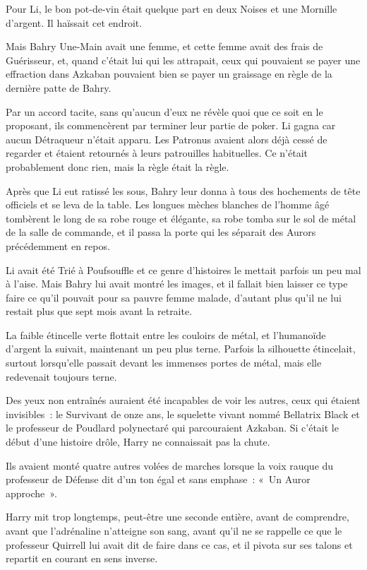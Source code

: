 Pour Li, le bon pot-de-vin était quelque part en deux Noises et une Mornille d'argent. Il haïssait cet endroit.

Mais Bahry Une-Main avait une femme, et cette femme avait des frais de Guérisseur, et, quand c'était lui qui les attrapait, ceux qui pouvaient se payer une effraction dans Azkaban pouvaient bien se payer un graissage en règle de la dernière patte de Bahry.

Par un accord tacite, sans qu'aucun d'eux ne révèle quoi que ce soit en le proposant, ils commencèrent par terminer leur partie de poker. Li gagna car aucun Détraqueur n'était apparu. Les Patronus avaient alors déjà cessé de regarder et étaient retournés à leurs patrouilles habituelles. Ce n'était probablement donc rien, mais la règle était la règle.

Après que Li eut ratissé les sous, Bahry leur donna à tous des hochements de tête officiels et se leva de la table. Les longues mèches blanches de l'homme âgé tombèrent le long de sa robe rouge et élégante, sa robe tomba sur le sol de métal de la salle de commande, et il passa la porte qui les séparait des Aurors précédemment en repos.

Li avait été Trié à Poufsouffle et ce genre d'histoires le mettait parfois un peu mal à l'aise. Mais Bahry lui avait montré les images, et il fallait bien laisser ce type faire ce qu'il pouvait pour sa pauvre femme malade, d'autant plus qu'il ne lui restait plus que sept mois avant la retraite.

\later

La faible étincelle verte flottait entre les couloirs de métal, et l'humanoïde d'argent la suivait, maintenant un peu plus terne. Parfois la silhouette étincelait, surtout lorsqu'elle passait devant les immenses portes de métal, mais elle redevenait toujours terne.

Des yeux non entraînés auraient été incapables de voir les autres, ceux qui étaient invisibles~: le Survivant de onze ans, le squelette vivant nommé Bellatrix Black et le professeur de Poudlard polynectaré qui parcouraient Azkaban. Si c'était le début d'une histoire drôle, Harry ne connaissait pas la chute.

Ils avaient monté quatre autres volées de marches lorsque la voix rauque du professeur de Défense dit d'un ton égal et sans emphase~: «~Un Auror approche~».

Harry mit trop longtemps, peut-être une seconde entière, avant de comprendre, avant que l'adrénaline n'atteigne son sang, avant qu'il ne se rappelle ce que le professeur Quirrell lui avait dit de faire dans ce cas, et il pivota sur ses talons et repartit en courant en sens inverse.

